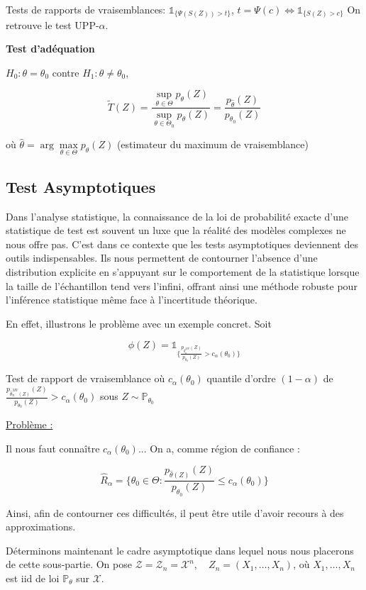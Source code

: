 \documentclass[12pt]{article}
\newcommand{\espace}{\vspace{1.5em}}
\newcommand{\petitespace}{\vspace{0.5cm}}
\newcommand{\bb}[1]{\mathbb{#1}} %
\renewcommand{\P}{\bb{P}}%
\renewcommand{\cal}{\mathcal}
\newcommand{\Sup}[1]{\sup\limits_{#1}}%
\newcommand{\Max}[1]{\max\limits_{#1}}
\newcommand{\Xunan}{X_1,\ldots,X_n} %
\newcommand{\EMV}{\widehat{\theta}_n^{MV}}
\newcommand{\1}{\bb{1}} %
\begin{document}
Tests de rapports de vraisemblances: $\1_{\{\Psi(S(Z))>t \}}$, $t=\Psi(c) \iff \1_{\{ S(Z)>c \}} $ On retrouve le test UPP-$\alpha$.
\petitespace

\textbf{Test d'adéquation}\petitespace

$H_0 : \theta = \theta_0$ contre $H_1 : \theta \ne \theta_0$, 

$$\widetilde T(Z) = \frac{\Sup{\theta \in \Theta}p_\theta(Z)}{\Sup{\theta \in \Theta_0}p_\theta(Z)} = \frac{p_{\widehat \theta}(Z)}{p_{\theta_0}(Z)}$$

où $\widehat \theta = \arg \Max{\theta \in \Theta}p_\theta(Z)$ (estimateur du maximum de vraisemblance)\petitespace

\subsection{Test Asymptotiques}

\petitespace

Dans l'analyse statistique, la connaissance de la loi de probabilité exacte d'une statistique de test est souvent un luxe que la réalité des modèles complexes ne nous offre pas. C'est dans ce contexte que les tests asymptotiques deviennent des outils indispensables. Ils nous permettent de contourner l'absence d'une distribution explicite en s'appuyant sur le comportement de la statistique lorsque la taille de l'échantillon tend vers l'infini, offrant ainsi une méthode robuste pour l'inférence statistique même face à l'incertitude théorique.

En effet, illustrons le problème avec un exemple concret. Soit 

$$\phi(Z) = \1_{\big\{  \frac{p_{\EMV}(Z)}{p_{\theta_0}(Z)}>c_\alpha(\theta_0) \big\}}$$

Test de rapport de vraisemblance où $c_\alpha(\theta_0)$ quantile d'ordre $(1-\alpha)$ de $\frac{p_{\EMV(Z)}(Z)}{p_{\theta_0}(Z)}>c_\alpha(\theta_0)$ sous $Z \sim \P_{\theta_0}$\petitespace

\underline{Problème :} \petitespace

Il nous faut connaître $c_\alpha(\theta_0)$... On a, comme région de confiance : \petitespace

$$\widehat R_\alpha = \big\{ \theta_0 \in \Theta : \frac{p_{\widehat \theta(Z)}(Z)}{p_{\theta_0}(Z)} \le c_\alpha(\theta_0) \big\} $$


Ainsi, afin de contourner ces difficultés, il peut être utile d'avoir recours à des approximations.\espace

Déterminons maintenant le cadre asymptotique dans lequel nous nous placerons de cette sous-partie. On pose $\cal Z = \cal Z_n = \cal X^n, \quad Z_n = (\Xunan)$, où $\Xunan$ est iid de loi $\P_\theta$ sur $\cal X$.
\end{document}
